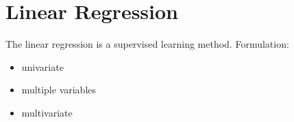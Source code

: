 \section{Linear Regression}
The linear regression is a supervised learning method. %
Formulation:
\begin{itemize}
   \item univariate
   \item multiple variables
   \item multivariate
\end{itemize}